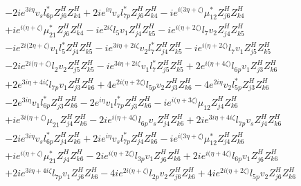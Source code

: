 \begin{align}
 &-2 i e^{3 i \eta } v_s l_{6p}^* Z_{{j 6}}^{H} Z_{{k 4}}^{H} +2 i e^{i \eta } v_s l_{7p}^* Z_{{j 6}}^{H} Z_{{k 4}}^{H} -i e^{i \Big(3 \eta +\zeta \Big)} \mu_{12}^* Z_{{j 6}}^{H} Z_{{k 4}}^{H} \nonumber \\ 
 &+i e^{i \Big(\eta +\zeta \Big)} \mu_{21}^* Z_{{j 6}}^{H} Z_{{k 4}}^{H} -i e^{2 i \zeta } l_5 v_1 Z_{{j 4}}^{H} Z_{{k 5}}^{H} -i e^{i \Big(\eta +2 \zeta \Big)} l_7 v_2 Z_{{j 4}}^{H} Z_{{k 5}}^{H} \nonumber \\ 
 &-i e^{2 i \Big(2 \eta +\zeta \Big)} v_1 l_5^* Z_{{j 4}}^{H} Z_{{k 5}}^{H} -i e^{3 i \eta +2 i \zeta } v_2 l_7^* Z_{{j 4}}^{H} Z_{{k 5}}^{H} -i e^{i \Big(\eta +2 \zeta \Big)} l_7 v_1 Z_{{j 5}}^{H} Z_{{k 5}}^{H} \nonumber \\ 
 &-2 i e^{2 i \Big(\eta +\zeta \Big)} l_2 v_2 Z_{{j 5}}^{H} Z_{{k 5}}^{H} -i e^{3 i \eta +2 i \zeta } v_1 l_7^* Z_{{j 5}}^{H} Z_{{k 5}}^{H} +2 e^{i \Big(\eta +4 \zeta \Big)} l_{6p} v_1 Z_{{j 3}}^{H} Z_{{k 6}}^{H} \nonumber \\ 
 &+2 e^{3 i \eta +4 i \zeta } l_{7p} v_1 Z_{{j 3}}^{H} Z_{{k 6}}^{H} +4 e^{2 i \Big(\eta +2 \zeta \Big)} l_{5p} v_2 Z_{{j 3}}^{H} Z_{{k 6}}^{H} -4 e^{2 i \eta } v_2 l_{5p}^* Z_{{j 3}}^{H} Z_{{k 6}}^{H} \nonumber \\ 
 &-2 e^{3 i \eta } v_1 l_{6p}^* Z_{{j 3}}^{H} Z_{{k 6}}^{H} -2 e^{i \eta } v_1 l_{7p}^* Z_{{j 3}}^{H} Z_{{k 6}}^{H} -i e^{i \Big(\eta +3 \zeta \Big)} \mu_{12} Z_{{j 4}}^{H} Z_{{k 6}}^{H} \nonumber \\ 
 &+i e^{3 i \Big(\eta +\zeta \Big)} \mu_{21} Z_{{j 4}}^{H} Z_{{k 6}}^{H} -2 i e^{i \Big(\eta +4 \zeta \Big)} l_{6p} v_s Z_{{j 4}}^{H} Z_{{k 6}}^{H} +2 i e^{3 i \eta +4 i \zeta } l_{7p} v_s Z_{{j 4}}^{H} Z_{{k 6}}^{H} \nonumber \\ 
 &-2 i e^{3 i \eta } v_s l_{6p}^* Z_{{j 4}}^{H} Z_{{k 6}}^{H} +2 i e^{i \eta } v_s l_{7p}^* Z_{{j 4}}^{H} Z_{{k 6}}^{H} -i e^{i \Big(3 \eta +\zeta \Big)} \mu_{12}^* Z_{{j 4}}^{H} Z_{{k 6}}^{H} \nonumber \\ 
 &+i e^{i \Big(\eta +\zeta \Big)} \mu_{21}^* Z_{{j 4}}^{H} Z_{{k 6}}^{H} -2 i e^{i \Big(\eta +2 \zeta \Big)} l_{3p} v_1 Z_{{j 6}}^{H} Z_{{k 6}}^{H} +2 i e^{i \Big(\eta +4 \zeta \Big)} l_{6p} v_1 Z_{{j 6}}^{H} Z_{{k 6}}^{H} \nonumber \\ 
 &+2 i e^{3 i \eta +4 i \zeta } l_{7p} v_1 Z_{{j 6}}^{H} Z_{{k 6}}^{H} -4 i e^{2 i \Big(\eta +\zeta \Big)} l_{2p} v_2 Z_{{j 6}}^{H} Z_{{k 6}}^{H} +4 i e^{2 i \Big(\eta +2 \zeta \Big)} l_{5p} v_2 Z_{{j 6}}^{H} Z_{{k 6}}^{H} \nonumber \\ 

\end{align}
